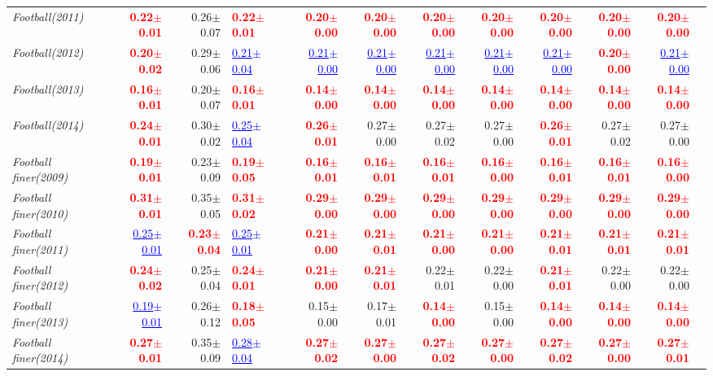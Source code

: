 \documentclass[nohyperref]{article}
\theoremstyle{plain}
\theoremstyle{definition}
\theoremstyle{remark}
\newcommand{\red}[1]{\textcolor{red}{\textbf{#1}}}
\newcommand{\blue}[1]{\textcolor{blue}{\underline{#1}}}
\begin{document}
\begin{table*}[tb!]
{\begin{tabular}{l|rr p{5em}| rrrrrrrr}
			{\it Football(2011)} & \red{0.22$\pm$0.01} & 0.26$\pm$0.07 & \red{0.22$\pm$0.01} & \red{0.20$\pm$0.00} & \red{0.20$\pm$0.00} & \red{0.20$\pm$0.00} & \red{0.20$\pm$0.00} & \red{0.20$\pm$0.00} & \red{0.20$\pm$0.00} & \red{0.20$\pm$0.00} \\
			{\it Football(2012)} & \red{0.20$\pm$0.02} & 0.29$\pm$0.06 & \blue{0.21$\pm$0.04} & \blue{0.21$\pm$0.00} & \blue{0.21$\pm$0.00} & \blue{0.21$\pm$0.00} & \blue{0.21$\pm$0.00} & \blue{0.21$\pm$0.00} & \red{0.20$\pm$0.00} & \blue{0.21$\pm$0.00} \\
			{\it Football(2013)} & \red{0.16$\pm$0.01} & 0.20$\pm$0.07 & \red{0.16$\pm$0.01} & \red{0.14$\pm$0.00} & \red{0.14$\pm$0.00} & \red{0.14$\pm$0.00} & \red{0.14$\pm$0.00} & \red{0.14$\pm$0.00} & \red{0.14$\pm$0.00} & \red{0.14$\pm$0.00} \\
			{\it Football(2014)} & \red{0.24$\pm$0.01} & 0.30$\pm$0.02 & \blue{0.25$\pm$0.04} & \red{0.26$\pm$0.01} & 0.27$\pm$0.00 & 0.27$\pm$0.02 & 0.27$\pm$0.00 & \red{0.26$\pm$0.01} & 0.27$\pm$0.02 & 0.27$\pm$0.00 \\
			{\it Football finer(2009)} & \red{0.19$\pm$0.01} & 0.23$\pm$0.09 & \red{0.19$\pm$0.05} & \red{0.16$\pm$0.01} & \red{0.16$\pm$0.01} & \red{0.16$\pm$0.01} & \red{0.16$\pm$0.00} & \red{0.16$\pm$0.01} & \red{0.16$\pm$0.01} & \red{0.16$\pm$0.00} \\
			{\it Football finer(2010)} & \red{0.31$\pm$0.01} & 0.35$\pm$0.05 & \red{0.31$\pm$0.02} & \red{0.29$\pm$0.00} & \red{0.29$\pm$0.00} & \red{0.29$\pm$0.00} & \red{0.29$\pm$0.00} & \red{0.29$\pm$0.00} & \red{0.29$\pm$0.00} & \red{0.29$\pm$0.00} \\
			{\it Football finer(2011)} & \blue{0.25$\pm$0.01} & \red{0.23$\pm$0.04} & \blue{0.25$\pm$0.01} & \red{0.21$\pm$0.00} & \red{0.21$\pm$0.01} & \red{0.21$\pm$0.00} & \red{0.21$\pm$0.00} & \red{0.21$\pm$0.01} & \red{0.21$\pm$0.01} & \red{0.21$\pm$0.01} \\
			{\it Football finer(2012)} & \red{0.24$\pm$0.02} & 0.25$\pm$0.04 & \red{0.24$\pm$0.01} & \red{0.21$\pm$0.00} & \red{0.21$\pm$0.01} & 0.22$\pm$0.01 & 0.22$\pm$0.00 & \red{0.21$\pm$0.01} & 0.22$\pm$0.00 & 0.22$\pm$0.00 \\
			{\it Football finer(2013)} & \blue{0.19$\pm$0.01} & 0.26$\pm$0.12 & \red{0.18$\pm$0.05} & 0.15$\pm$0.00 & 0.17$\pm$0.01 & \red{0.14$\pm$0.00} & 0.15$\pm$0.00 & \red{0.14$\pm$0.00} & \red{0.14$\pm$0.00} & \red{0.14$\pm$0.00} \\
			{\it Football finer(2014)} & \red{0.27$\pm$0.01} & 0.35$\pm$0.09 & \blue{0.28$\pm$0.04} & \red{0.27$\pm$0.02} & \red{0.27$\pm$0.00} & \red{0.27$\pm$0.02} & \red{0.27$\pm$0.00} & \red{0.27$\pm$0.02} & \red{0.27$\pm$0.00} & \red{0.27$\pm$0.01} \\
			\bottomrule
		\end{tabular}}
\end{table*}
\end{document}
